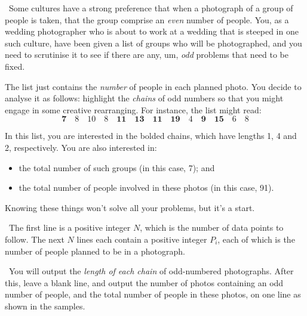 

\Question\ Some cultures have a strong preference that when a photograph of a group of
people is taken, that the group comprise an \emph{even} number of people. You, as a
wedding photographer who is about to work at a wedding that is steeped in one such
culture, have been given a list of groups who will be photographed, and you need to
scrutinise it to see if there are any, um, \emph{odd} problems that need to be fixed.

The list just contains the \emph{number} of people in each planned photo. You decide to
analyse it as follows: highlight the \emph{chains} of odd numbers so that you might engage
in some creative rearranging. For instance, the list might read: \[
  \mathbf{7}
  \quad 8 \quad 10 \quad 8
  \quad \mathbf{11} \quad \mathbf{13} \quad \mathbf{11} \quad \mathbf{19}
  \quad 4
  \quad \mathbf{9} \quad \mathbf{15}
  \quad 6 \quad 8
\]

In this list, you are interested in the bolded chains, which have lengths 1, 4 and 2,
respectively. You are also interested in:
\begin{itemize}
  \item the total number of such groups (in this case, 7); and
  \item the total number of people involved in these photos (in this case, 91).
\end{itemize}

Knowing these things won't solve all your problems, but it's a start.

\Input\ The first line is a positive integer $N$, which is the number of data points to
follow. The next $N$ lines each contain a positive integer $P_i$, each of which is the
number of people planned to be in a photograph.

\Output\ You will output the \emph{length of each chain} of odd-numbered photographs.
After this, leave a blank line, and output the number of photos containing an odd number
of people, and the total number of people in these photos, on one line as shown in the
samples.

\Sample

